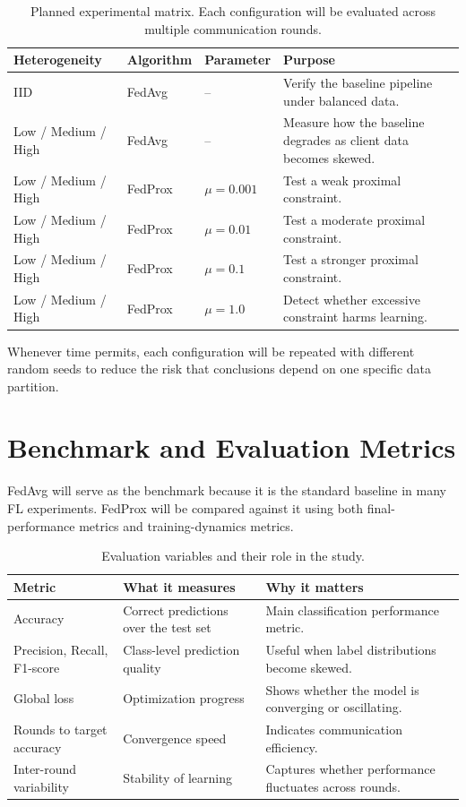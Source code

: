 \documentclass[11pt,a4paper]{article}
\begin{document}
\begin{table}[H]
\centering
\caption{Planned experimental matrix. Each configuration will be evaluated across multiple communication rounds.}
\begin{tabularx}{\textwidth}{L{2.6cm} L{2.4cm} L{2.4cm} Y}
\toprule
\textbf{Heterogeneity} & \textbf{Algorithm} & \textbf{Parameter} & \textbf{Purpose} \\
\midrule
IID & FedAvg & -- & Verify the baseline pipeline under balanced data. \\
Low / Medium / High & FedAvg & -- & Measure how the baseline degrades as client data becomes skewed. \\
Low / Medium / High & FedProx & $\mu=0.001$ & Test a weak proximal constraint. \\
Low / Medium / High & FedProx & $\mu=0.01$ & Test a moderate proximal constraint. \\
Low / Medium / High & FedProx & $\mu=0.1$ & Test a stronger proximal constraint. \\
Low / Medium / High & FedProx & $\mu=1.0$ & Detect whether excessive constraint harms learning. \\
\bottomrule
\end{tabularx}
\end{table}

Whenever time permits, each configuration will be repeated with different random seeds to reduce the risk that conclusions depend on one specific data partition.

\section{Benchmark and Evaluation Metrics}

FedAvg will serve as the benchmark because it is the standard baseline in many FL experiments. FedProx will be compared against it using both final-performance metrics and training-dynamics metrics.

\begin{table}[H]
\centering
\caption{Evaluation variables and their role in the study.}
\begin{tabularx}{\textwidth}{L{3.1cm} L{3.6cm} Y}
\toprule
\textbf{Metric} & \textbf{What it measures} & \textbf{Why it matters} \\
\midrule
Accuracy & Correct predictions over the test set & Main classification performance metric. \\
Precision, Recall, F1-score & Class-level prediction quality & Useful when label distributions become skewed. \\
Global loss & Optimization progress & Shows whether the model is converging or oscillating. \\
Rounds to target accuracy & Convergence speed & Indicates communication efficiency. \\
Inter-round variability & Stability of learning & Captures whether performance fluctuates across rounds. \\
\bottomrule
\end{tabularx}
\end{table}
\end{document}
